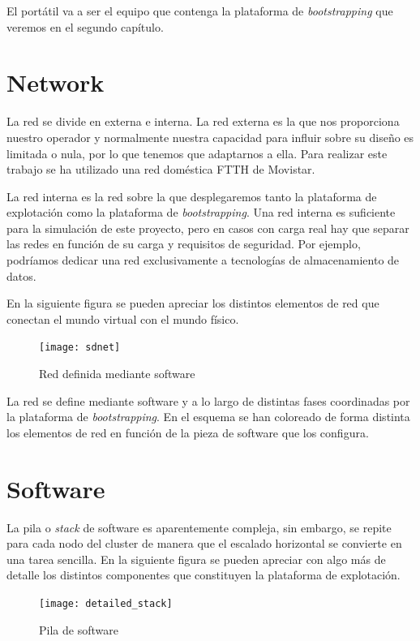 \documentclass[a4paper,12pt,spanish,final]{epsc_tfc_pfc}
\begin{document}
El portátil va a ser el equipo que contenga la plataforma de \emph{bootstrapping} que veremos en el segundo capítulo.

\section{Network}

La red se divide en externa e interna. La red externa es la que nos proporciona nuestro operador y normalmente nuestra capacidad para influir sobre su diseño es limitada o nula, por lo que tenemos que adaptarnos a ella. Para realizar este trabajo se ha utilizado una red doméstica FTTH de Movistar.

La red interna es la red sobre la que desplegaremos tanto la plataforma de explotación como la plataforma de \emph{bootstrapping}. Una red interna es suficiente para la simulación de este proyecto, pero en casos con carga real hay que separar las redes en función de su carga y requisitos de seguridad. Por ejemplo, podríamos dedicar una red exclusivamente a tecnologías de almacenamiento de datos.

En la siguiente figura se pueden apreciar los distintos elementos de red que conectan el mundo virtual con el mundo físico.

\begin{figure}[h]
  \centering
    \texttt{[image: sdnet]}
      \caption{Red definida mediante software}
\end{figure}

La red se define mediante software y a lo largo de distintas fases coordinadas por la plataforma de \emph{bootstrapping}. En el esquema se han coloreado de forma distinta los elementos de red en función de la pieza de software que los configura.

\section{Software}

La pila o \emph{stack} de software es aparentemente compleja, sin embargo, se repite para cada nodo del cluster de manera que el escalado horizontal se convierte en una tarea sencilla. En la siguiente figura se pueden apreciar con algo más de detalle los distintos componentes que constituyen la plataforma de explotación.

\begin{figure}[h]
  \centering
    \texttt{[image: detailed\_stack]}
      \caption{Pila de software}
\end{figure}
\end{document}
